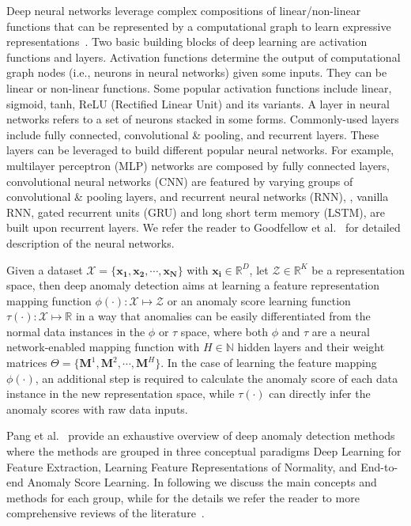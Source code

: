 Deep neural networks leverage complex compositions of linear/non-linear functions that can be represented by a computational graph to learn expressive representations~\cite{Goodfellow-et-al-2016}. Two basic building blocks of deep learning are activation functions and layers. Activation functions determine the output of computational graph nodes (i.e., neurons in neural networks) given some inputs. They can be linear or non-linear functions. Some popular activation functions include linear, sigmoid, tanh, ReLU (Rectified Linear Unit) and its variants. A layer in neural networks refers to a set of neurons stacked in some forms. Commonly-used layers include fully connected, convolutional \& pooling, and recurrent layers. These layers can be leveraged to build different popular neural networks. For example, multilayer perceptron (MLP) networks are composed by fully connected layers, convolutional neural networks (CNN) are featured by varying groups of convolutional \& pooling layers, and recurrent neural networks (RNN), \eg, vanilla RNN, gated recurrent units (GRU) and long short term memory (LSTM), are built upon recurrent layers. We refer the reader to Goodfellow et al.~\cite{Goodfellow-et-al-2016} for detailed description of the neural networks.

Given a dataset $\mathcal{X} =\{\mathbf{x_1}, \mathbf{x_2}, \cdots, \mathbf{x_N}\}$ with $\mathbf{x_i} \in \mathbb{R}^{D}$, let $\mathcal{Z} \in \mathbb{R}^{K}$ be a representation space, then deep anomaly detection aims at learning a feature representation mapping function $\phi(\cdot): \mathcal{X} \mapsto \mathcal{Z}$ or an anomaly score learning function $\tau(\cdot):\mathcal{X} \mapsto \mathbb{R}$ in a way that anomalies can be easily differentiated from the normal data instances in the $\phi$ or $\tau$ space, where both $\phi$ and $\tau$ are a neural network-enabled mapping function with $H \in \mathbb{N}$ hidden layers and their weight matrices $\Theta=\{\mathbf{M}^{1}, \mathbf{M}^{2}, \cdots, \mathbf{M}^{H}\}$. In the case of learning the feature mapping $\phi(\cdot)$, an additional step is required to calculate the anomaly score of each data instance in the new representation space, while $\tau(\cdot)$ can directly infer the anomaly scores with raw data inputs. 

Pang et al.~\cite{pang2020deep} provide an exhaustive overview of deep anomaly detection methods where the methods are grouped in three conceptual paradigms Deep Learning for Feature Extraction, Learning Feature Representations of Normality, and End-to-end Anomaly Score Learning. In following we discuss the main concepts and methods for each group, while for the details we refer the reader to more comprehensive reviews of the literature~\cite{pang2020deep,chalapathy2019deep}.

